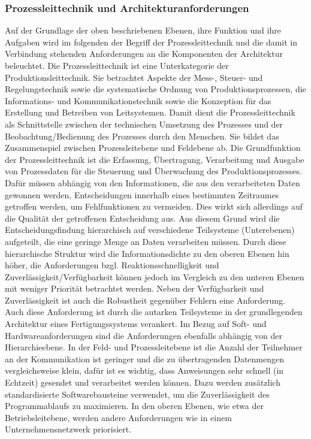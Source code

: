 \subsubsection{Prozessleittechnik und Architekturanforderungen}
Auf der Grundlage der oben beschriebenen Ebenen, ihre Funktion und ihre Aufgaben wird im folgenden der Begriff der Prozessleittechnik und die damit in Verbindung stehenden Anforderungen an die Komponenten der Architektur beleuchtet. 
Die Prozessleittechnik ist eine Unterkategorie der Produktionsleittechnik. Sie betrachtet Aspekte der Mess-, Steuer- und Regelungstechnik sowie die systematische Ordnung von Produktionsprozessen, die Informations- und Kommunikationstechnik sowie die Konzeption für das Erstellung und Betreiben von Leitsystemen. Damit dient die Prozessleittechnik als Schnittstelle zwischen der technischen Umsetzung des Prozesses und der Beobachtung/Bedienung des Prozesses durch den Menschen. Sie bildet das Zusammenspiel zwischen Prozessleitebene und Feldebene ab. 
Die Grundfunktion der Prozessleittechnik ist die Erfassung, Übertragung, Verarbeitung und Ausgabe von Prozessdaten für die Steuerung und Überwachung des Produktionsprozesses. Dafür müssen abhängig von den Informationen, die aus den verarbeiteten Daten gewonnen werden, Entscheidungen innerhalb eines bestimmten Zeitraumes getroffen werden, um Fehlfunktionen zu vermeiden. Dies wirkt sich allerdings auf die Qualität der getroffenen Entscheidung aus. Aus diesem Grund wird die Entscheidungsfindung hierarchisch auf verschiedene Teilsysteme (Unterebenen) aufgeteilt, die eine geringe Menge an Daten verarbeiten müssen. Durch diese hierarchische Struktur wird die Informationsdichte zu den oberen Ebenen hin höher, die Anforderungen bzgl. Reaktionsschnelligkeit und Zuverlässigkeit/Verfügbarkeit können jedoch im Vergleich zu den unteren Ebenen mit weniger Priorität betrachtet werden. 
Neben der Verfügbarkeit und Zuverlässigkeit ist auch die Robustheit gegenüber Fehlern eine Anforderung. Auch diese Anforderung ist durch die autarken Teilsysteme in der grundlegenden Architektur eines Fertigungssystems verankert.
Im Bezug auf Soft- und Hardwareanforderungen sind die Anforderungen ebenfalls abhängig von der Hierarchieebene. In der Feld- und Prozessleitebene ist die Anzahl der Teilnehmer an der Kommunikation ist geringer und die zu übertragenden Datenmengen vergleichsweise klein, dafür ist es wichtig, dass Anweisungen sehr schnell (in Echtzeit) gesendet und verarbeitet werden können. Dazu werden zusätzlich standardisierte Softwarebausteine verwendet, um die Zuverlässigkeit des Programmablaufs zu maximieren. 
In den oberen Ebenen, wie etwa der Betriebsleitebene, werden andere Anforderungen wie in einem Unternehmensnetzwerk priorisiert\citep{Linke2017}. 


